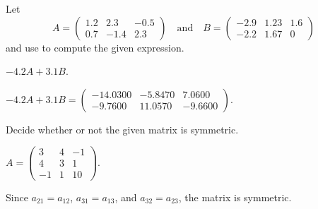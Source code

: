 \documentclass{ximera}
\def\AND{\quad\mbox{and}\quad}
\begin{document}
\matlabproblemlabel

\noindent Let  \[ A = \left(\begin{array}{rrr} 1.2 & 2.3 & -0.5\\ 0.7 & -1.4 & 2.3 \end{array}\right) \AND B = \left(\begin{array}{rrr} -2.9 & 1.23 & 1.6\\ -2.2 & 1.67 & 0 \end{array}\right) \] and use \Matlab to compute the given expression.

\begin{computerExercise}  \label{c1.2.4a}
$-4.2A+3.1B$.

\begin{solution}
$-4.2A + 3.1B = \left(\begin{array}{rrr} 
-14.0300 & -5.8470 &    7.0600 \\
 -9.7600 & 11.0570 &   -9.6600\end{array}\right)$.

\end{solution}
\end{computerExercise}





\problemlabel

\noindent Decide whether or not the given matrix is symmetric.

\begin{exercise} \label{c1.1.01e}
 $A = \left( \begin{array}{rrr}
 3 & 4 & -1\\
 4 & 3 &  1\\
 -1 & 1 & 10\end{array} \right)$.
  \begin{multipleChoice}
  \end{multipleChoice}
       

\begin{solution}
Since $a_{21} = a_{12}$, $a_{31} = a_{13}$, and $a_{32} = a_{23}$, the matrix is symmetric.

\end{solution}
\end{exercise}


\end{document}
